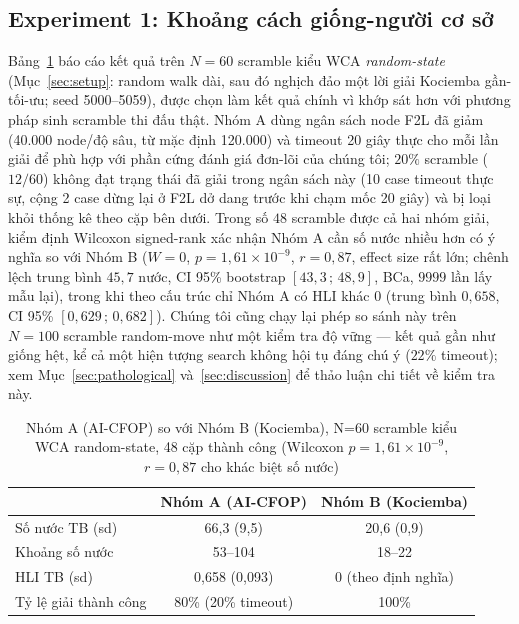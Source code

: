 \documentclass[10pt,conference]{article}
\begin{document}
\subsection{Experiment 1: Khoảng cách giống-người cơ sở}
Bảng~\ref{tab:exp1} báo cáo kết quả trên $N=60$ scramble kiểu WCA
\emph{random-state} (Mục~\ref{sec:setup}: random walk dài, sau đó
nghịch đảo một lời giải Kociemba gần-tối-ưu; seed 5000--5059), được
chọn làm kết quả chính vì khớp sát hơn với phương pháp sinh scramble
thi đấu thật. Nhóm A dùng ngân sách node F2L đã giảm (40.000
node/độ sâu, từ mặc định 120.000) và timeout 20 giây thực cho mỗi
lần giải để phù hợp với phần cứng đánh giá đơn-lõi của chúng tôi;
$20\%$ scramble ($12/60$) không đạt trạng thái đã giải trong ngân
sách này (10 case timeout thực sự, cộng 2 case dừng lại ở F2L dở
dang trước khi chạm mốc 20 giây) và bị loại khỏi thống kê theo cặp
bên dưới. Trong số $48$ scramble được cả hai nhóm giải,
kiểm định Wilcoxon signed-rank xác nhận Nhóm A cần số nước nhiều
hơn có ý nghĩa so với Nhóm B ($W=0$, $p=1,61\times10^{-9}$, $r=0,87$,
effect size rất lớn; chênh lệch trung bình $45,7$ nước, CI 95\% bootstrap
$[43,3\,;\,48,9]$, BCa, $9999$ lần lấy mẫu lại), trong khi theo cấu
trúc chỉ Nhóm A có HLI khác 0 (trung bình $0,658$, CI 95\%
$[0,629\,;\,0,682]$). Chúng tôi cũng chạy lại phép so sánh này trên
$N=100$ scramble
random-move như một kiểm tra độ vững --- kết quả gần như giống hệt,
kể cả một hiện tượng search không hội tụ đáng chú ý ($22\%$ timeout);
xem Mục~\ref{sec:pathological} và~\ref{sec:discussion} để thảo luận
chi tiết về kiểm tra này.

\begin{table}[h]
\centering
\caption{Nhóm A (AI-CFOP) so với Nhóm B (Kociemba), N=60 scramble
kiểu WCA random-state, 48 cặp thành công (Wilcoxon
$p=1,61\times10^{-9}$, $r=0,87$ cho khác biệt số nước)}
\begin{tabular}{lcc}
\toprule
 & Nhóm A (AI-CFOP) & Nhóm B (Kociemba) \\
\midrule
Số nước TB (sd) & 66,3 (9,5) & 20,6 (0,9) \\
Khoảng số nước & 53--104 & 18--22 \\
HLI TB (sd) & 0,658 (0,093) & 0 (theo định nghĩa) \\
Tỷ lệ giải thành công & 80\% (20\% timeout) & 100\% \\
\bottomrule
\end{tabular}
\label{tab:exp1}
\end{table}
\end{document}
